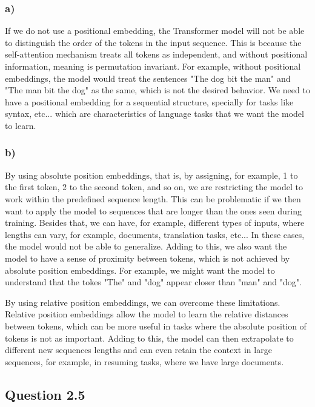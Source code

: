 \documentclass{article}
\begin{document}
\subsubsection*{a)}

If we do not use a positional embedding, the Transformer model will not be able to distinguish the order of the tokens in the
input sequence. This is because the self-attention mechanism treats all tokens as independent, and without positional information,
meaning is permutation invariant. For example, without positional embeddings, the model would treat the sentences "The dog bit the man"
and "The man bit the dog" as the same, which is not the desired behavior. We need to have a positional embedding
for a sequential structure, specially for tasks like syntax, etc... which are characteristics of language tasks that we
want the model to learn.

\subsubsection*{b)}

By using absolute position embeddings, that is, by assigning, for example, 1 to the first token, 2 to the second token, and so on,
we are restricting the model to work within the predefined sequence length. This can be problematic if we then want to apply the model
to sequences that are longer than the ones seen during training. Besides that, we can have, for example, different types of inputs, 
where lengths can vary, for example, documents, translation tasks, etc... In these cases, the model would not be able to generalize.
Adding to this, we also want the model to have a sense of proximity between tokens, which is not achieved by absolute position embeddings.
For example, we might want the model to understand that the tokes "The" and "dog" appear closer than "man" and "dog".

By using relative position embeddings, we can overcome these limitations. Relative position embeddings allow the model to learn
the relative distances between tokens, which can be more useful in tasks where the absolute position of tokens is not as important.
Adding to this, the model can then extrapolate to different new sequences lengths and can even retain the context in large
sequences, for example, in resuming tasks, where we have large documents.


\subsection*{Question 2.5}
\end{document}

